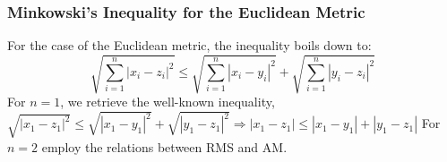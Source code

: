 \begin{frame}
\frametitle{Minkowski's Inequality for the Euclidean Metric}
For the case of the Euclidean metric, the inequality boils down to:
\begin{equation*}
    \sqrt{\sum_{i=1}^{n} |x_i - z_i|^2} \leq  \sqrt{\sum_{i=1}^{n} |x_i - y_i|^2} +  \sqrt{\sum_{i=1}^{n} |y_i - z_i|^2}
\end{equation*}
For $n=1$, we retrieve the well-known inequality, 
$\sqrt{|x_1 - z_1|^2} \leq  \sqrt{|x_1 - y_1|^2} +  \sqrt{|y_1 - z_1|^2}
\Rightarrow|x_1 - z_1|\leq |x_1 - y_1|+|y_1 - z_1|$ \hfill\break \hfill\break
For $n=2$ employ the relations between RMS and AM.
\end{frame}